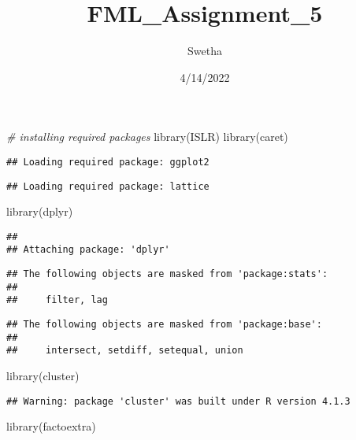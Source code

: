 \documentclass[
]{article}
\title{FML\_Assignment\_5}
\author{Swetha}
\date{4/14/2022}
\newenvironment{Shaded}{\begin{snugshade}}{\end{snugshade}}
\newcommand{\CommentTok}[1]{\textcolor[rgb]{0.56,0.35,0.01}{\textit{#1}}}
\newcommand{\FunctionTok}[1]{\textcolor[rgb]{0.00,0.00,0.00}{#1}}
\newcommand{\NormalTok}[1]{#1}
\begin{document}
\maketitle

\begin{Shaded}
\begin{Highlighting}[]
\CommentTok{\# installing required packages}
\FunctionTok{library}\NormalTok{(ISLR)}
\FunctionTok{library}\NormalTok{(caret)}
\end{Highlighting}
\end{Shaded}

\begin{verbatim}
## Loading required package: ggplot2
\end{verbatim}

\begin{verbatim}
## Loading required package: lattice
\end{verbatim}

\begin{Shaded}
\begin{Highlighting}[]
\FunctionTok{library}\NormalTok{(dplyr)}
\end{Highlighting}
\end{Shaded}

\begin{verbatim}
## 
## Attaching package: 'dplyr'
\end{verbatim}

\begin{verbatim}
## The following objects are masked from 'package:stats':
## 
##     filter, lag
\end{verbatim}

\begin{verbatim}
## The following objects are masked from 'package:base':
## 
##     intersect, setdiff, setequal, union
\end{verbatim}

\begin{Shaded}
\begin{Highlighting}[]
\FunctionTok{library}\NormalTok{(cluster)}
\end{Highlighting}
\end{Shaded}

\begin{verbatim}
## Warning: package 'cluster' was built under R version 4.1.3
\end{verbatim}

\begin{Shaded}
\begin{Highlighting}[]
\FunctionTok{library}\NormalTok{(factoextra)}
\end{Highlighting}
\end{Shaded}
\end{document}
